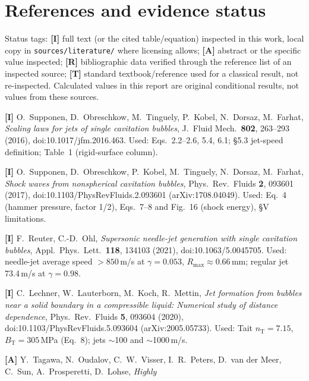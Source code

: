 \section{References and evidence status}\label{sec:refs}
Status tags: \textbf{[I]} full text (or the cited table/equation) inspected in this work, local copy in
\texttt{sources/literature/} where licensing allows; \textbf{[A]} abstract or the specific value inspected;
\textbf{[R]} bibliographic data verified through the reference list of an inspected source; \textbf{[T]} standard
textbook/reference used for a classical result, not re-inspected. Calculated values in this report are original
conditional results, not values from these sources.
\sloppy
\begin{enumerate}[leftmargin=*,itemsep=1pt,label={[\arabic*]}]
\item \textbf{[I]} O.~Supponen, D.~Obreschkow, M.~Tinguely, P.~Kobel, N.~Dorsaz, M.~Farhat, \emph{Scaling laws for jets of single
cavitation bubbles}, J.\ Fluid Mech.\ \textbf{802}, 263--293 (2016), doi:10.1017/jfm.2016.463. Used: Eqs.~2.2--2.6, 5.4, 6.1;
\S5.3 jet-speed definition; Table~1 (rigid-surface column).
\item \textbf{[I]} O.~Supponen, D.~Obreschkow, P.~Kobel, M.~Tinguely, N.~Dorsaz, M.~Farhat, \emph{Shock waves from nonspherical
cavitation bubbles}, Phys.\ Rev.\ Fluids \textbf{2}, 093601 (2017), doi:10.1103/PhysRevFluids.2.093601 (arXiv:1708.04049). Used:
Eq.~4 (hammer pressure, factor 1/2), Eqs.~7--8 and Fig.~16 (shock energy), \S V limitations.
\item \textbf{[I]} F.~Reuter, C.-D.~Ohl, \emph{Supersonic needle-jet generation with single cavitation bubbles}, Appl.\ Phys.\ Lett.\
\textbf{118}, 134103 (2021), doi:10.1063/5.0045705. Used: needle-jet average speed $>850$\,m/s at $\gamma=0.053$, $R_{\max}\approx0.66$\,mm;
regular jet 73.4\,m/s at $\gamma=0.98$.
\item \textbf{[I]} C.~Lechner, W.~Lauterborn, M.~Koch, R.~Mettin, \emph{Jet formation from bubbles near a solid boundary in a
compressible liquid: Numerical study of distance dependence}, Phys.\ Rev.\ Fluids \textbf{5}, 093604 (2020),
doi:10.1103/PhysRevFluids.5.093604 (arXiv:2005.05733). Used: Tait $n_{\mathrm T}=7.15$, $B_{\mathrm T}=305$\,MPa (Eq.~8); jets
$\sim$100 and $\sim$1000\,m/s.
\item \textbf{[A]} Y.~Tagawa, N.~Oudalov, C.~W.~Visser, I.~R.~Peters, D.~van der Meer, C.~Sun, A.~Prosperetti, D.~Lohse, \emph{Highly
}
\end{enumerate}
